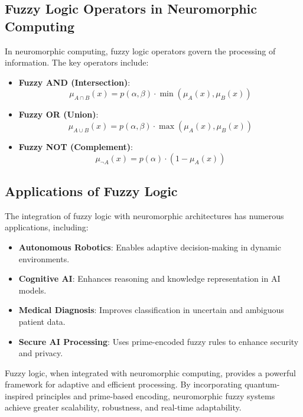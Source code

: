 \documentclass{article}
\theoremstyle{plain}
\begin{document}
\subsection{Fuzzy Logic Operators in Neuromorphic Computing}
In neuromorphic computing, fuzzy logic operators govern the processing of information. The key operators include:
\begin{itemize}
    \item \textbf{Fuzzy AND (Intersection)}:
    \begin{equation}
        \mu_{A \cap B}(x) = p(\alpha, \beta) \cdot \min(\mu_A(x), \mu_B(x))
    \end{equation}
    \item \textbf{Fuzzy OR (Union)}:
    \begin{equation}
        \mu_{A \cup B}(x) = p(\alpha, \beta) \cdot \max(\mu_A(x), \mu_B(x))
    \end{equation}
    \item \textbf{Fuzzy NOT (Complement)}:
    \begin{equation}
        \mu_{\neg A}(x) = p(\alpha) \cdot (1 - \mu_A(x))
    \end{equation}
\end{itemize}

\subsection{Applications of Fuzzy Logic}
The integration of fuzzy logic with neuromorphic architectures has numerous applications, including:
\begin{itemize}
    \item \textbf{Autonomous Robotics}: Enables adaptive decision-making in dynamic environments.
    \item \textbf{Cognitive AI}: Enhances reasoning and knowledge representation in AI models.
    \item \textbf{Medical Diagnosis}: Improves classification in uncertain and ambiguous patient data.
    \item \textbf{Secure AI Processing}: Uses prime-encoded fuzzy rules to enhance security and privacy.
\end{itemize}

Fuzzy logic, when integrated with neuromorphic computing, provides a powerful framework for adaptive and efficient processing. By incorporating quantum-inspired principles and prime-based encoding, neuromorphic fuzzy systems achieve greater scalability, robustness, and real-time adaptability.
\end{document}
